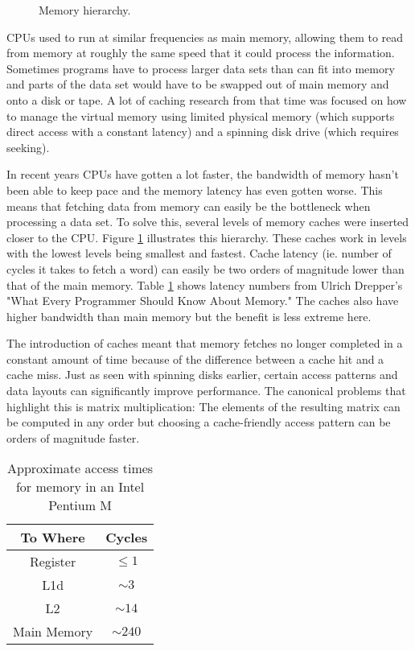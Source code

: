 \documentclass[a4paper,oneside]{memoir}
\begin{document}
\begin{figure}
  \centering
  
  \caption{Memory hierarchy.}
  \label{hierarchy}
\end{figure}

CPUs used to run at similar frequencies as main memory, allowing them to read
from memory at roughly the same speed that it could process the information.
Sometimes programs have to process larger data sets than can fit into memory
and parts of the data set would have to be swapped out of main memory and onto
a disk or tape. A lot of caching research from that time was focused on how to
manage the virtual memory using limited physical memory (which supports direct
access with a constant latency) and a spinning disk drive (which requires seeking).

In recent years CPUs have gotten a lot faster, the bandwidth of memory
hasn't been able to keep pace and the memory latency has even gotten worse.\cite{Novark:2006,Chilimbi:1999,Reinhold:1994,Eiron:1999} This
means that fetching data from memory can easily be the bottleneck when processing
a data set. To solve this, several levels of memory caches were inserted closer
to the CPU. Figure \ref{hierarchy} illustrates this hierarchy. These caches work
in levels with the lowest levels being smallest
and fastest. Cache latency (ie. number of cycles it takes to fetch a word) can
easily be two orders of magnitude lower than that of the main memory. Table
\ref{latency} shows latency numbers from Ulrich Drepper's "What
Every Programmer Should Know About Memory." \cite{Drepper}
The caches also have higher bandwidth than main memory but
the benefit is less extreme here.

The introduction of caches meant that memory fetches no longer completed in a
constant amount of time because of the difference between a cache hit and
a cache miss. Just as seen with spinning disks earlier, certain access patterns
and data layouts can significantly improve performance.\cite{Chilimbi:1999}
The canonical problems
that highlight this is matrix multiplication: The elements of the resulting
matrix can be computed in any order but choosing a cache-friendly access pattern
can be orders of magnitude faster.\cite{Chilimbi:1999,Eiron:1999}

\begin{table}
  \centering
  \caption{Approximate access times for memory in an Intel Pentium M}
  \begin{tabular}{c | c}
    To Where & Cycles \\ \hline
    Register & $\le 1$ \\
    L1d & $\sim 3$ \\
    L2 & $\sim 14$ \\
    Main Memory & $\sim 240$
  \end{tabular}
  \label{latency}
\end{table}
\end{document}
